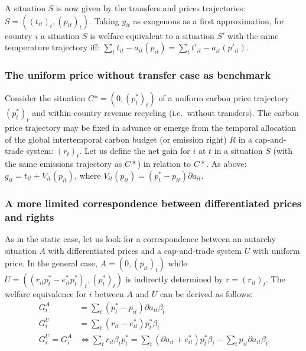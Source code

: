 \documentclass[
  letterpaper,
  DIV=11,
  numbers=noendperiod]{scrartcl}
\begin{document}
A situation \(S\) is now given by the transfers and prices trajectories:
\(S=((t_{it})_t, (p_{it})_t)\). Taking \(y_{it}\) as exogenous as a
first approximation, for country \(i\) a situation \(S\) is
welfare-equivalent to a situation \(S'\) with the same temperature
trajectory iff:
\(\sum_t t_{it} - a_{it}(p_{it}) = \sum_t t'_{it} - a_{it}(p'_{it})\).

\subsubsection{The uniform price without transfer case as
benchmark}\label{the-uniform-price-without-transfer-case-as-benchmark}

Consider the situation \(C*=(0,(p^*_t)_t)\) of a uniform carbon price
trajectory \((p^*_t)_t\) and within-country revenue recycling
(i.e.~without transfers). The carbon price trajectory may be fixed in
advance or emerge from the temporal allocation of the global
intertemporal carbon budget (or emission right) \(R\) in a cap-and-trade
system: \((r_{t})_t\). Let us define the net gain for \(i\) at \(t\) in
a situation \(S\) (with the same emissions trajectory as \(C*\)) in
relation to \(C*\). As above: \(g_{it} = t_{it} + V_{it}(p_{it})\),
where \(V_{it}(p_{it}) = (p^*_t - p_{it}) \partial a_{it}\).

\subsubsection{A more limited correspondence between differentiated
prices and
rights}\label{a-more-limited-correspondence-between-differentiated-prices-and-rights}

As in the static case, let us look for a correspondence between an
autarchy situation \(A\) with differentiated prices and a cap-and-trade
system \(U\) with uniform price. In the general case,
\(A=(0, (p_{it})_t)\) while
\(U=((r_{it}p^*_t-e^*_{it}p^*_t)_t, (p^*_t)_t)\) is indirectly
determined by \(r=(r_{it})_t\). The welfare equivalence for \(i\)
between \(A\) and \(U\) can be derived as follows: \[\begin{aligned}
G^A_i &= \sum_t (p^*_t - p_{it}) \partial a_{it} \beta_t \\
G^U_i &= \sum_t (r_{it} - e^*_{it}) p^*_t \beta_t \\
G^U_i = G^A_i &\Leftrightarrow \sum_t r_{it} \beta_t p^*_t  = \sum_t (\partial a_{it} + e^*_{it}) p^*_t \beta_t - \sum_t p_{it} \partial a_{it} \beta_t  
\end{aligned}\]
\end{document}

